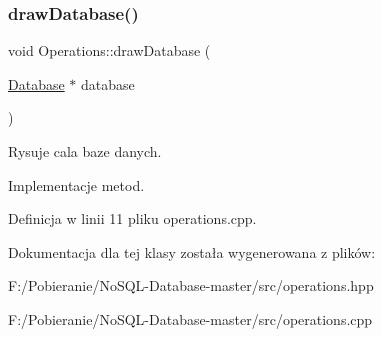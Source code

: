 \subsubsection{\texorpdfstring{draw\+Database()}{drawDatabase()}}
{\footnotesize\ttfamily void Operations\+::draw\+Database (\begin{DoxyParamCaption}\item[{\mbox{\hyperlink{class_database}{Database}} $\ast$}]{database }\end{DoxyParamCaption})\hspace{0.3cm}{\ttfamily [static]}}



Rysuje cala baze danych. 

Implementacje metod. 

Definicja w linii 11 pliku operations.\+cpp.



Dokumentacja dla tej klasy została wygenerowana z plików\+:\begin{DoxyCompactItemize}
\item 
F\+:/\+Pobieranie/\+No\+S\+Q\+L-\/\+Database-\/master/src/operations.\+hpp\item 
F\+:/\+Pobieranie/\+No\+S\+Q\+L-\/\+Database-\/master/src/operations.\+cpp\end{DoxyCompactItemize}
